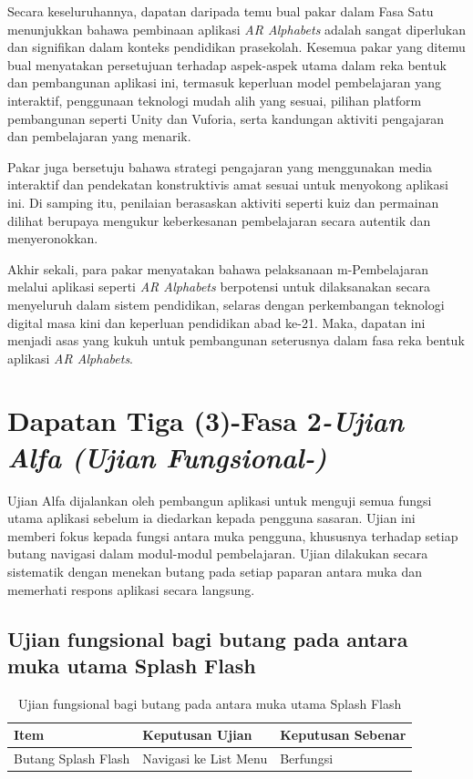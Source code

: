 {{Secara keseluruhannya, dapatan daripada temu bual pakar dalam Fasa Satu menunjukkan bahawa pembinaan aplikasi \textit{AR Alphabets} adalah sangat diperlukan dan signifikan dalam konteks pendidikan prasekolah. Kesemua pakar yang ditemu bual menyatakan persetujuan terhadap aspek-aspek utama dalam reka bentuk dan pembangunan aplikasi ini, termasuk keperluan model pembelajaran yang interaktif, penggunaan teknologi mudah alih yang sesuai, pilihan platform pembangunan seperti Unity dan Vuforia, serta kandungan aktiviti pengajaran dan pembelajaran yang menarik.

Pakar juga bersetuju bahawa strategi pengajaran yang menggunakan media interaktif dan pendekatan konstruktivis amat sesuai untuk menyokong aplikasi ini. Di samping itu, penilaian berasaskan aktiviti seperti kuiz dan permainan dilihat berupaya mengukur keberkesanan pembelajaran secara autentik dan menyeronokkan.

Akhir sekali, para pakar menyatakan bahawa pelaksanaan m-Pembelajaran melalui aplikasi seperti \textit{AR Alphabets} berpotensi untuk dilaksanakan secara menyeluruh dalam sistem pendidikan, selaras dengan perkembangan teknologi digital masa kini dan keperluan pendidikan abad ke-21. Maka, dapatan ini menjadi asas yang kukuh untuk pembangunan seterusnya dalam fasa reka bentuk aplikasi \textit{AR Alphabets}.

\clearpage

\section{{\textbf{Dapatan Tiga (3)-Fasa 2}\textit{-Ujian Alfa (Ujian Fungsional-)}}}

Ujian Alfa dijalankan oleh pembangun aplikasi untuk menguji semua fungsi utama aplikasi sebelum ia diedarkan kepada pengguna sasaran. Ujian ini memberi fokus kepada fungsi antara muka pengguna, khususnya terhadap setiap butang navigasi dalam modul-modul pembelajaran. Ujian dilakukan secara sistematik dengan menekan butang pada setiap paparan antara muka dan memerhati respons aplikasi secara langsung.

\subsection{{Ujian fungsional bagi butang pada antara muka utama Splash Flash}}
\begin{table}[h]
\centering
\caption{Ujian fungsional bagi butang pada antara muka utama Splash Flash}
\label{jadual-5-1}
\begin{tabular}{lll}
\toprule
\textbf{Item} & \textbf{Keputusan Ujian} & \textbf{Keputusan Sebenar} \\ \midrule
Butang Splash Flash & Navigasi ke List Menu & Berfungsi \\ \bottomrule
\end{tabular}
\end{table}

}}
